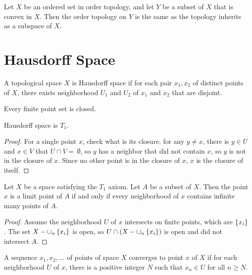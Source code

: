 \begin{theorem}\label{convex_order_topology_are_the_same}
    Let $X$ be an ordered set in order topology, and let $Y$ be a subset of $X$ that is convex in $X$. Then the order topology on $Y$ is the same as the topology inherits as a subspace of $X$.    
\end{theorem}






\section{Hausdorff Space}

\begin{definition}
    A topological space $X$ is Hausdorff space if for each pair $x_1, x_2$ of distinct points of $X$, there exists neighborhood $U_1$ and $U_2$ of $x_1$ and $x_2$ that are disjoint.
\end{definition}

\begin{definition}
Every finite point set is closed.    
\end{definition}

\begin{theorem}
    Hausdorff space is $T_1$.
\end{theorem}
\begin{proof}
    For a single point $x$, check what is its closure. for any $y \neq x$, there is $y \in U$ and $x \in V$ that $U \cap V = \ \emptyset$, so $y$ has a neighbor that did not contain $x$, so $y$ is not in the closure of $x$. Since no other point is in the closure of $x$, $x$ is the closure of itself.
\end{proof}


\begin{theorem}
Let $X$ be a space satisfying the $T_1$ axiom. Let $A$ be a subset of $X$. Then the point $x$ is a limit point of $A$ if and only if every neighborhood of $x$ contains infinite many points of $A$.    
\end{theorem}
\begin{proof}
    Assume the neighborhood $U$ of $x$ intersects on finite points, which are $\set{x_i}$. The set $X - \cup_n \set{x_i}$ is open, so $U \cap (X - \cup_n \set{x_i})$ is open and did not intersect $A$.
\end{proof}


\begin{definition}
    A sequence $x_1, x_2, ... $ of points of space $X$ converges to point $x$ of $X$ if for each neighborhood $U$ of $x$, there is a positive integer $N$ such that $x_n \in U$ for all $n \geq N$.
\end{definition}

